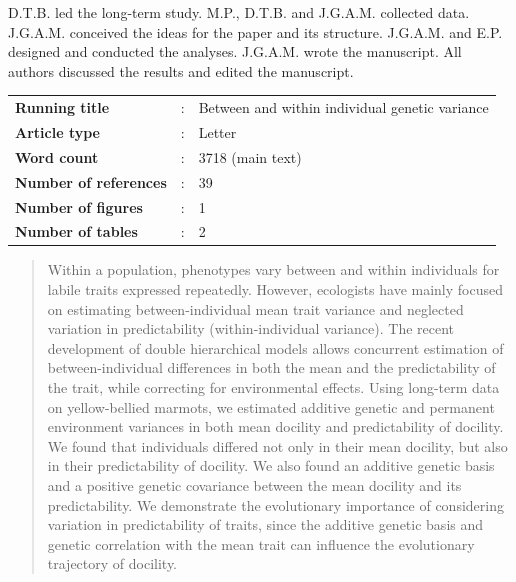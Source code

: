 \documentclass[a4paper,12pt,twoside]{article}
\begin{document}
	\begin{contribution}
		D.T.B. led the long-term study.
		M.P., D.T.B. and J.G.A.M. collected data.
		J.G.A.M. conceived the ideas for the paper and its structure.
		J.G.A.M. and E.P. designed and conducted the analyses.
		J.G.A.M. wrote the manuscript.
		All authors discussed the results and edited the manuscript. 
	\end{contribution}
	
	\vfill
	\begin{tabular}{>{\bfseries}lcl}
		Running title &:& Between and within individual genetic variance \\
		Article type &:& Letter\\ 
		Word count &:& 3718 (main text) \\
		Number of references &:& 39 \\
		Number of figures &:& 1 \\
		Number of tables &:& 2 \\
	\end{tabular}
	\vfill
	\newpage
	
	\doublespacing
	\begin{abstract}
		Within a population, phenotypes vary between and within individuals for labile traits expressed repeatedly.
		However, ecologists have mainly focused on estimating between-individual mean trait variance and neglected variation in predictability (within-individual variance).
		The recent development of double hierarchical models allows concurrent estimation of between-individual differences in both the mean and the predictability of the trait, while correcting for environmental effects. 
		Using long-term data on yellow-bellied marmots, we estimated additive genetic and permanent environment variances in both mean docility and predictability of docility.
		We found that individuals differed not only in their mean docility, but also in their predictability of docility.
		We also found an additive genetic basis and a positive genetic covariance between the mean docility and its predictability. 
		We demonstrate the evolutionary importance of considering variation in predictability of traits, since the additive genetic basis and genetic correlation with the mean trait can influence the evolutionary trajectory of docility.
\end{abstract}
	
\end{document}
